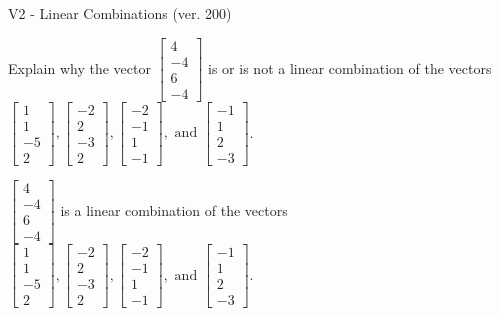 \begin{exercise}
  \begin{exerciseTitle}V2 - Linear Combinations (ver. 200)\end{exerciseTitle}
  \begin{exerciseStatement}
    Explain why the vector \(\left[\begin{array}{c}
4 \\
-4 \\
6 \\
-4
\end{array}\right]\)  is or is not a linear 
	combination of the vectors \(\left[\begin{array}{c}
1 \\
1 \\
-5 \\
2
\end{array}\right] , \left[\begin{array}{c}
-2 \\
2 \\
-3 \\
2
\end{array}\right] , \left[\begin{array}{c}
-2 \\
-1 \\
1 \\
-1
\end{array}\right] , \text{ and } \left[\begin{array}{c}
-1 \\
1 \\
2 \\
-3
\end{array}\right]\).
	


  \end{exerciseStatement}
  \begin{exerciseAnswer}
   \(\left[\begin{array}{c}
4 \\
-4 \\
6 \\
-4
\end{array}\right]\) 
  	 is  
	a linear combination of the vectors \(\left[\begin{array}{c}
1 \\
1 \\
-5 \\
2
\end{array}\right] , \left[\begin{array}{c}
-2 \\
2 \\
-3 \\
2
\end{array}\right] , \left[\begin{array}{c}
-2 \\
-1 \\
1 \\
-1
\end{array}\right] , \text{ and } \left[\begin{array}{c}
-1 \\
1 \\
2 \\
-3
\end{array}\right]\).


\end{exerciseAnswer}
\end{exercise}
